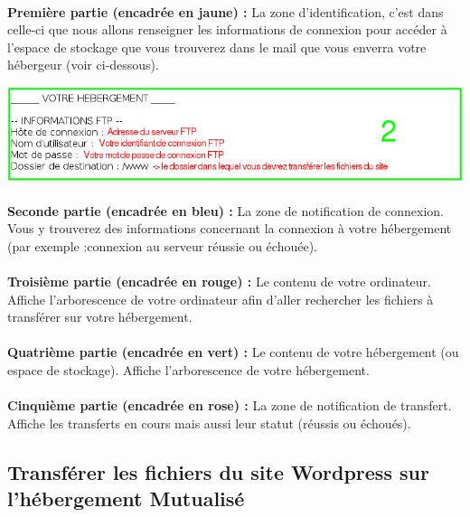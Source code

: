 \documentclass[10pt,a4paper]{article}
\begin{document}
\paragraph{}\textbf{Première partie (encadrée en jaune) :} La zone d'identification, c'est dans celle-ci que nous allons renseigner les informations de connexion pour accéder à l'espace de stockage que vous trouverez dans le mail que vous enverra votre hébergeur (voir ci-dessous).
\begin{center}
\includegraphics[scale=0.4]{img/0031.png}
\end{center}
\paragraph{}\textbf{Seconde partie (encadrée en bleu) :} La zone de notification de connexion. Vous y trouverez des informations concernant la connexion à votre hébergement (par exemple :connexion au serveur réussie ou échouée).
\paragraph{}\textbf{Troisième partie (encadrée en rouge) :} Le contenu de votre ordinateur. Affiche l'arborescence de votre ordinateur afin d'aller rechercher les fichiers à transférer sur votre hébergement.
\paragraph{}\textbf{Quatrième partie (encadrée en vert) :} Le contenu de votre hébergement (ou espace de stockage). Affiche l'arborescence de votre hébergement.
\paragraph{}\textbf{Cinquième partie (encadrée en rose) :} La zone de notification de transfert. Affiche les transferts en cours mais aussi leur statut (réussis ou échoués).

\subsection{Transférer les fichiers du site Wordpress sur l'hébergement Mutualisé}
\end{document}
